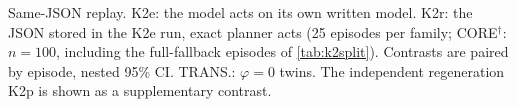 \begin{table}[!htbp]
\centering
\caption{Same-JSON replay. K2e: the model acts on its own written model. K2r: the JSON stored in the K2e run, exact planner acts (25 episodes per family; CORE$^\dagger$: $n{=}100$, including the full-fallback episodes of \cref{tab:k2split}). Contrasts are paired by episode, nested 95\% CI. TRANS.: $\varphi{=}0$ twins. The independent regeneration K2p is shown as a supplementary contrast.}
\label{tab:k2replay}
\scriptsize\setlength{\tabcolsep}{3pt}
\resizebox{\linewidth}{!}{}
\end{table}
